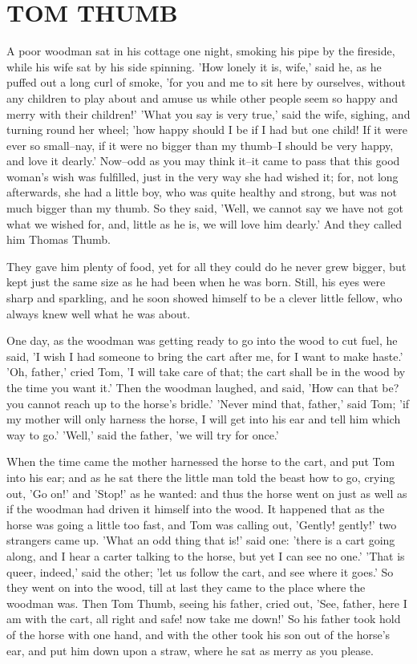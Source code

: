 \documentclass[12pt]{book}
\begin{document}
\chapter{TOM THUMB}

A poor woodman sat in his cottage one night, smoking his pipe by the
fireside, while his wife sat by his side spinning. 'How lonely it is,
wife,' said he, as he puffed out a long curl of smoke, 'for you and me
to sit here by ourselves, without any children to play about and amuse
us while other people seem so happy and merry with their children!'
'What you say is very true,' said the wife, sighing, and turning round
her wheel; 'how happy should I be if I had but one child! If it were
ever so small--nay, if it were no bigger than my thumb--I should be
very happy, and love it dearly.' Now--odd as you may think it--it came
to pass that this good woman's wish was fulfilled, just in the very
way she had wished it; for, not long afterwards, she had a little boy,
who was quite healthy and strong, but was not much bigger than my
thumb. So they said, 'Well, we cannot say we have not got what we
wished for, and, little as he is, we will love him dearly.' And they
called him Thomas Thumb.

They gave him plenty of food, yet for all they could do he never grew
bigger, but kept just the same size as he had been when he was born.
Still, his eyes were sharp and sparkling, and he soon showed himself
to be a clever little fellow, who always knew well what he was about.

One day, as the woodman was getting ready to go into the wood to cut
fuel, he said, 'I wish I had someone to bring the cart after me, for I
want to make haste.' 'Oh, father,' cried Tom, 'I will take care of
that; the cart shall be in the wood by the time you want it.' Then the
woodman laughed, and said, 'How can that be? you cannot reach up to
the horse's bridle.' 'Never mind that, father,' said Tom; 'if my
mother will only harness the horse, I will get into his ear and tell
him which way to go.' 'Well,' said the father, 'we will try for once.'

When the time came the mother harnessed the horse to the cart, and put
Tom into his ear; and as he sat there the little man told the beast
how to go, crying out, 'Go on!' and 'Stop!' as he wanted: and thus the
horse went on just as well as if the woodman had driven it himself
into the wood. It happened that as the horse was going a little too
fast, and Tom was calling out, 'Gently! gently!' two strangers came
up. 'What an odd thing that is!' said one: 'there is a cart going
along, and I hear a carter talking to the horse, but yet I can see no
one.' 'That is queer, indeed,' said the other; 'let us follow the
cart, and see where it goes.' So they went on into the wood, till at
last they came to the place where the woodman was. Then Tom Thumb,
seeing his father, cried out, 'See, father, here I am with the cart,
all right and safe! now take me down!' So his father took hold of the
horse with one hand, and with the other took his son out of the
horse's ear, and put him down upon a straw, where he sat as merry as
you please.
\end{document}
